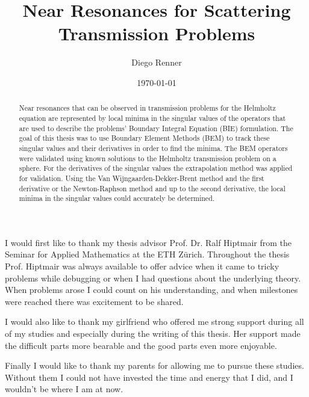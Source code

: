\documentclass[a4paper, oneside]{thirdparty_stylesheets/discothesis}
\title{Near Resonances for Scattering Transmission Problems}
\author{Diego Renner}
\institute{Seminar for Applied Mathematics \\[2pt]
	Computational Science and Engineering \\[2pt]
ETH Zürich}
\date{\today}
\begin{document}
\frontmatter %
\maketitle
\cleardoublepage

\begin{acknowledgements}
	I would first like to thank my thesis advisor Prof. Dr. Ralf Hiptmair from the Seminar for Applied Mathematics at the ETH Zürich.
	Throughout the thesis Prof. Hiptmair was always available to offer advice when it came to tricky problems while debugging or when I had questions about the underlying theory.
	When problems arose I could count on his understanding, and when milestones were reached there was excitement to be shared.

	I would also like to thank my girlfriend who offered me strong support during all of my studies and especially during the writing of this thesis.
	Her support made the difficult parts more bearable and the good parts even more enjoyable.

	Finally I would like to thank my parents for allowing me to pursue these studies.
	Without them I could not have invested the time and energy that I did, and I wouldn't be where I am at now.
\end{acknowledgements}


\begin{abstract}
	Near resonances that can be observed in transmission problems for the Helmholtz equation are represented by local minima in the singular values of the operators that are used to describe the problems' Boundary Integral Equation (BIE) formulation.
	The goal of this thesis was to use Boundary Element Methods (BEM) to track these singular values and their derivatives in order to find the minima.
	The BEM operators were validated using known solutions to the Helmholtz transmission problem on a sphere.
	For the derivatives of the singular values the extrapolation method was applied for validation.
	Using the Van Wijngaarden-Dekker-Brent method and the first derivative or the Newton-Raphson method and up to the second derivative, the local minima in the singular values could accurately be determined.
\end{abstract}

\tableofcontents

\mainmatter %

\end{document}
